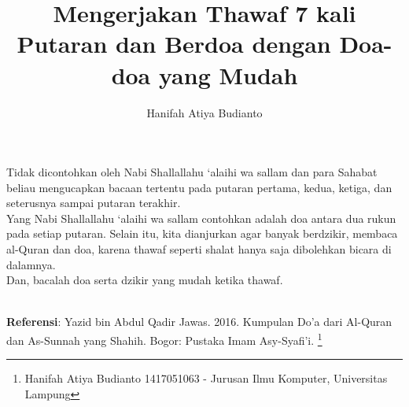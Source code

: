 \documentclass[a4paper,12pt]{article}
\title{\Large Mengerjakan Thawaf 7 kali Putaran dan Berdoa dengan Doa-doa 
yang Mudah}
\author{\calligra Hanifah Atiya Budianto}
\begin{document}
\sffamily
\maketitle 
\fullvocalize
\par
\indent
Tidak dicontohkan oleh Nabi Shallallahu ‘alaihi wa sallam dan para Sahabat 
beliau mengucapkan bacaan tertentu pada putaran pertama, kedua, ketiga, dan 
seterusnya sampai putaran terakhir.\\
\indent
Yang Nabi Shallallahu ‘alaihi wa sallam contohkan adalah doa antara dua rukun 
pada setiap putaran. Selain itu, kita dianjurkan agar banyak berdzikir, 
membaca al-Quran dan doa, karena thawaf seperti shalat hanya saja dibolehkan 
bicara di dalamnya.
\\
\indent
Dan, bacalah doa serta dzikir yang mudah ketika thawaf.\\\\
\par
\noindent
\textbf{Referensi}: Yazid bin Abdul Qadir Jawas. 2016. Kumpulan Do'a dari
Al-Quran dan As-Sunnah yang Shahih. Bogor: Pustaka Imam Asy-Syafi'i.
\footnote{Hanifah Atiya Budianto 1417051063 - Jurusan Ilmu Komputer,
Universitas Lampung}
\end{document}
